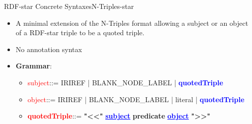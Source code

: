 \documentclass[aspectratio=169]{beamer}
\begin{document}
\begin{frame}{RDF-star Concrete Syntaxes}{N-Triples-star}
    \begin{itemize}
        \item A minimal extension of the N-Triples format allowing a subject or an object of a RDF-star triple to be a quoted triple.
        \item No annotation syntax
        \item \textbf{Grammar}:
        \begin{itemize}
            \item \textcolor{red}{subject}\quad\quad\quad::= IRIREF | BLANK\_NODE\_LABEL | \textcolor{blue}{\textbf{quotedTriple}}
            \item \textcolor{red}{object}\quad\quad\quad::= IRIREF | BLANK\_NODE\_LABEL | literal | \textcolor{blue}{\textbf{quotedTriple}}
            \item \textcolor{red}{\textbf{quotedTriple}}\quad\quad\quad::= \textbf{"<<"} \textcolor{blue}{\textbf{\underline{subject}}} \textbf{predicate} \textcolor{blue}{\textbf{\underline{object}}} \textbf{">>"}
        \end{itemize}
    \end{itemize}
\end{frame}
\end{document}
